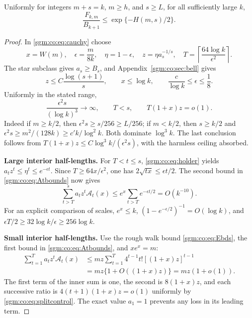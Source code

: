 \documentclass[11pt,letterpaper]{article}
\theoremstyle{remark}\newtheorem{remark}[theorem]{Remark}
\theoremstyle{definition}\newtheorem{definition}[theorem]{Definition}
\begin{document}
\begin{proposition}\label{sgm:co:prop:intermediate}
Uniformly for integers $m+s=k$, $m\ge h$, and $s\ge L$, for all sufficiently large $k$,
\begin{equation}\label{sgm:co:eq:intermediate}
 \frac{F_{k,m}}{B_{k+1}}\le\exp\{-H(m,s)/2\}.
\end{equation}
\end{proposition}
\begin{proof}
In \eqref{sgm:co:eq:cauchy} choose
\begin{equation}\label{sgm:co:eq:choices}
 x=W(m),\quad\epsilon=\frac{m}{8k},\quad\eta=1-\epsilon,
 \quad z=\eta a_s^{-1/s},\quad
 T=\left\lceil\frac{64\log k}{\epsilon^2}\right\rceil.
\end{equation}
The star subclass gives $a_s\ge B_s$, and Appendix~\ref{sgm:co:sec:bell} gives
\[
 z\le C\frac{\log(s+1)}s,\qquad x\le\log k,
 \qquad \frac c{\log k}\le\epsilon\le\frac18.
\]
Uniformly in the stated range,
\begin{equation}\label{sgm:co:eq:splitcontrol}
 \frac{\epsilon^2s}{(\log k)^3}\longrightarrow\infty,
 \qquad T<s,\qquad T(1+x)z=o(1).
\end{equation}
Indeed if $m\ge k/2$, then $\epsilon^2s\ge s/256\ge L/256$; if $m<k/2$, then $s\ge k/2$ and $\epsilon^2s\ge m^2/(128k)\ge c'k/\log^2k$. Both dominate $\log^3k$. The last conclusion follows from
$T(1+x)z\le C\log^3k/(\epsilon^2s)$, with the harmless ceiling absorbed.

\textbf{Large interior half-lengths.}
For $T<t\le s$, \eqref{sgm:co:eq:holder} yields
$a_tz^t\le\eta^t\le e^{-\epsilon t}$. Since $T\ge64x/\epsilon^2$, one has $2\sqrt{tx}\le\epsilon t/2$. The second bound in \eqref{sgm:co:eq:Atbounds} now gives
\begin{equation}\label{sgm:co:eq:highsplit}
 \sum_{t>T}^s a_tz^t\mathcal A_t(x)
 \le e^x\sum_{t>T}e^{-\epsilon t/2}=O(k^{-10}).
\end{equation}
For an explicit comparison of scales, $e^x\le k$,
$(1-e^{-\epsilon/2})^{-1}=O(\log k)$, and
$\epsilon T/2\ge32\log k/\epsilon\ge256\log k$.

\textbf{Small interior half-lengths.}
Use the rough walk bound \eqref{sgm:co:eq:Ebds}, the first bound in \eqref{sgm:co:eq:Atbounds}, and $xe^x=m$:
\begin{align}
 \sum_{t=1}^T a_tz^t\mathcal A_t(x)
 &\le mz\sum_{t=1}^T4^{t-1}t![(1+x)z]^{t-1}\nonumber\\
 &=mz\{1+O((1+x)z)\}=mz(1+o(1)).\label{sgm:co:eq:lowsplit}
\end{align}
The first term of the inner sum is one, the second is $8(1+x)z$, and each successive ratio is $4(t+1)(1+x)z=o(1)$ uniformly by \eqref{sgm:co:eq:splitcontrol}. The exact value $a_1=1$ prevents any loss in its leading term.


\end{proof}
\end{document}
